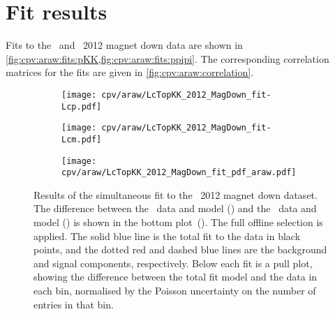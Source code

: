 \section{Fit results}
\label{chap:cpv:araw:results}

Fits to the \pKK\ and \ppipi\ 2012 magnet down data are shown in 
\cref{fig:cpv:araw:fits:pKK,fig:cpv:araw:fits:ppipi}.
The corresponding correlation matrices for the fits are given in 
\cref{fig:cpv:araw:correlation}.

\begin{figure}
  \begin{subfigure}[b]{0.5\textwidth}
    \texttt{[image: cpv/araw/LcTopKK\_2012\_MagDown\_fit-Lcp.pdf]}
    \caption{\PLambdac}
    \label{fig:cpv:araw:fits:pKK:Lcp}
  \end{subfigure}
  \begin{subfigure}[b]{0.5\textwidth}
    \texttt{[image: cpv/araw/LcTopKK\_2012\_MagDown\_fit-Lcm.pdf]}
    \caption{\APLambdac}
    \label{fig:cpv:araw:fits:pKK:Lcm}
  \end{subfigure}
  \begin{subfigure}[b]{0.5\textwidth}
    \texttt{[image: cpv/araw/LcTopKK\_2012\_MagDown\_fit\_pdf\_araw.pdf]}
    \caption{\ARaw}
    \label{fig:cpv:araw:fits:pKK:ARaw}
  \end{subfigure}
  \caption{%
    Results of the simultaneous fit to the \pKK\ 2012 magnet down dataset.
    The difference between the \PLambdac\ data and model 
    () and the \APLambdac\ data and model 
    () is shown in the bottom 
    plot~().
    The full offline selection is applied.
    The solid blue line is the total fit to the data in black points, and the 
    dotted red and dashed blue lines are the background and signal components, 
    respectively.
    Below each fit is a pull plot, showing the difference between the total fit 
    model and the data in each bin, normalised by the Poisson uncertainty on 
    the number of entries in that bin.
  }
  \label{fig:cpv:araw:fits:pKK}
\end{figure}


